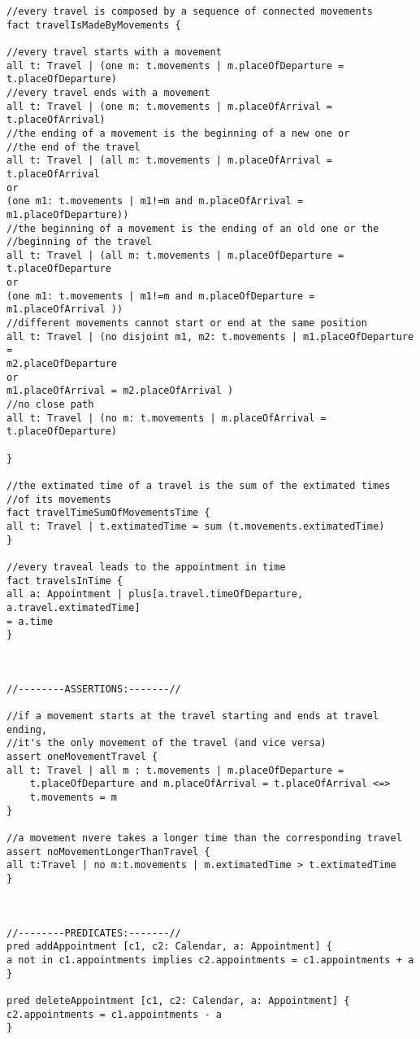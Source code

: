 \begin{lstlisting}
//every travel is composed by a sequence of connected movements
fact travelIsMadeByMovements {

//every travel starts with a movement
all t: Travel | (one m: t.movements | m.placeOfDeparture = t.placeOfDeparture)
//every travel ends with a movement
all t: Travel | (one m: t.movements | m.placeOfArrival = t.placeOfArrival)
//the ending of a movement is the beginning of a new one or 
//the end of the travel
all t: Travel | (all m: t.movements | m.placeOfArrival = t.placeOfArrival 
or
(one m1: t.movements | m1!=m and m.placeOfArrival = m1.placeOfDeparture))
//the beginning of a movement is the ending of an old one or the 
//beginning of the travel
all t: Travel | (all m: t.movements | m.placeOfDeparture = t.placeOfDeparture 
or
(one m1: t.movements | m1!=m and m.placeOfDeparture = m1.placeOfArrival ))
//different movements cannot start or end at the same position
all t: Travel | (no disjoint m1, m2: t.movements | m1.placeOfDeparture =
m2.placeOfDeparture
or
m1.placeOfArrival = m2.placeOfArrival )
//no close path
all t: Travel | (no m: t.movements | m.placeOfArrival = t.placeOfDeparture)

}

//the extimated time of a travel is the sum of the extimated times 
//of its movements
fact travelTimeSumOfMovementsTime {
all t: Travel | t.extimatedTime = sum (t.movements.extimatedTime)
}

//every traveal leads to the appointment in time
fact travelsInTime {
all a: Appointment | plus[a.travel.timeOfDeparture, a.travel.extimatedTime] 
= a.time													
}



//--------ASSERTIONS:-------//

//if a movement starts at the travel starting and ends at travel ending, 
//it's the only movement of the travel (and vice versa)
assert oneMovementTravel {
all t: Travel | all m : t.movements | m.placeOfDeparture = 
	t.placeOfDeparture and m.placeOfArrival = t.placeOfArrival <=> 
	t.movements = m
}	

//a movement nvere takes a longer time than the corresponding travel
assert noMovementLongerThanTravel {
all t:Travel | no m:t.movements | m.extimatedTime > t.extimatedTime
}



//--------PREDICATES:-------//
pred addAppointment [c1, c2: Calendar, a: Appointment] {
a not in c1.appointments implies c2.appointments = c1.appointments + a
}

pred deleteAppointment [c1, c2: Calendar, a: Appointment] {
c2.appointments = c1.appointments - a
}


\end{lstlisting}
